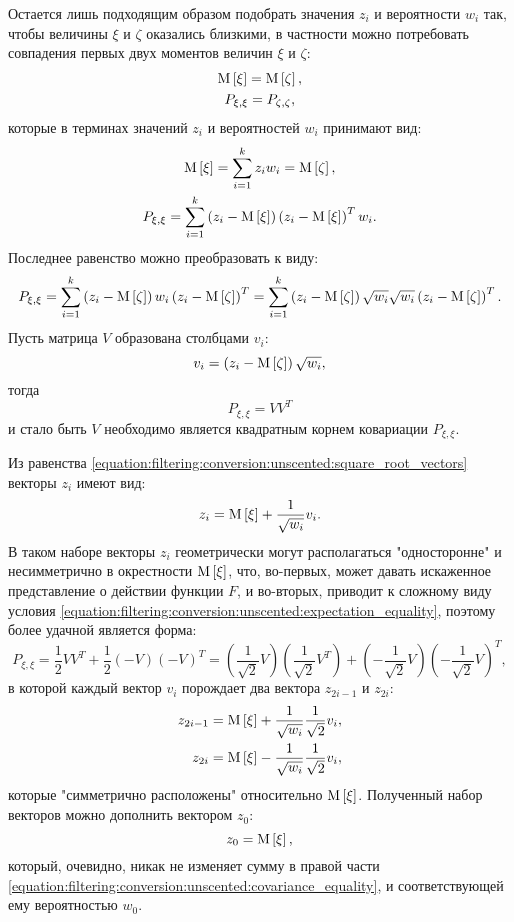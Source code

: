 Остается лишь подходящим образом подобрать значения $z_i$ и вероятности $w_i$ так, чтобы величины $\xi$ и $\zeta$ оказались близкими, в частности можно потребовать
совпадения первых двух моментов величин $\xi$ и $\zeta$:
\begin{gather*}
    \mathrm{M} \left [ \xi \right ] = \mathrm{M} \left [ \zeta \right ], \\
    P_{\xi, \xi} = P_{\zeta, \zeta},
\end{gather*}
которые в терминах значений $z_i$ и вероятностей $w_i$ принимают вид:
\begin{gather}
    \mathrm{M} \left [ \xi \right ] = \sum_{i=1}^k z_i w_i = \mathrm{M} \left [ \zeta \right ],
        \label{equation:filtering:conversion:unscented:expectation_equality} \\
    P_{\xi,\xi} = \sum_{i=1}^k \left ( z_i - \mathrm{M} \left [ \xi \right ] \right ) \left ( z_i - \mathrm{M} \left [ \xi \right ] \right )^T w_i .
        \label{equation:filtering:conversion:unscented:covariance_equality}
\end{gather}
Последнее равенство можно преобразовать к виду:
$$
    P_{\xi,\xi}
        = \sum_{i=1}^k \left ( z_i - \mathrm{M} \left [ \zeta \right ] \right ) w_i \left ( z_i - \mathrm{M} \left [ \zeta \right ] \right )^T
        = \sum_{i=1}^k \left ( z_i - \mathrm{M} \left [ \zeta \right ] \right ) \sqrt{w_i} \sqrt{w_i} \left ( z_i - \mathrm{M} \left [ \zeta \right ] \right )^T .
$$
Пусть матрица $V$ образована столбцами $v_i$:
\begin{equation} \label{equation:filtering:conversion:unscented:square_root_vectors}
    v_i = \left ( z_i - \mathrm{M} \left [ \zeta \right ] \right ) \sqrt{w_i} ,
\end{equation}
тогда
$$
    P_{\xi,\xi} = V V^T
$$
и стало быть $V$ необходимо является квадратным корнем ковариации $P_{\xi,\xi}$.

Из равенства \eqref{equation:filtering:conversion:unscented:square_root_vectors} векторы $z_i$ имеют вид:
$$
    z_i = \mathrm{M} \left [ \xi \right ] + \frac{1}{\sqrt{w_i}} v_i .
$$
В таком наборе векторы $z_i$ геометрически могут располагаться "односторонне"{} и несимметрично в окрестности $\mathrm{M} \left [ \xi \right ]$, что, во-первых, может давать
искаженное представление о действии функции $F$, и во-вторых, приводит к сложному виду условия \eqref{equation:filtering:conversion:unscented:expectation_equality}, поэтому
более удачной является форма:
$$
    P_{\xi,\xi}
        = \frac{1}{2} V V^T + \frac{1}{2} (-V) (-V)^T
        = \left ( \frac{1}{\sqrt{2}} V \right ) \left ( \frac{1}{\sqrt{2}} V^T \right ) + \left ( - \frac{1}{\sqrt{2}} V \right ) \left ( - \frac{1}{\sqrt{2}} V \right )^T ,
$$
в которой каждый вектор $v_i$ порождает два вектора $z_{2i-1}$ и $z_{2i}$:
\begin{align*}
    z_{2i-1} & = \mathrm{M} \left [ \xi \right ] + \frac{1}{\sqrt{w_i}} \frac{1}{\sqrt{2}} v_i, \\
    z_{2i} & = \mathrm{M} \left [ \xi \right ] -  \frac{1}{\sqrt{w_i}} \frac{1}{\sqrt{2}} v_i,
\end{align*}
которые "симметрично расположены"{} относительно $\mathrm{M} \left [ \xi \right ]$. Полученный набор векторов можно дополнить вектором $z_0$:
$$
    z_0 = \mathrm{M} \left [ \xi \right ] ,
$$
который, очевидно, никак не изменяет сумму в правой части \eqref{equation:filtering:conversion:unscented:covariance_equality}, и соответствующей ему вероятностью $w_0$.

